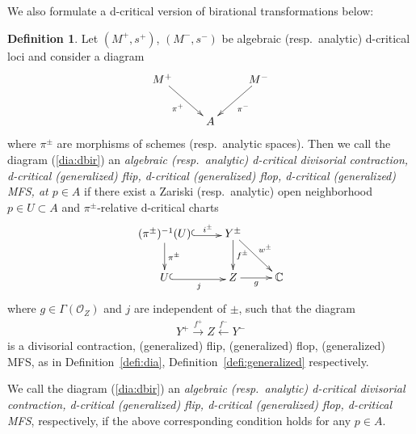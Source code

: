\documentclass[11pt]{amsart}
\theoremstyle{plain}
\theoremstyle{definition}
\newtheorem{defi}[thm]{Definition}
\theoremstyle{remark}
\newcommand{\oO}{\mathcal{O}}
\begin{document}
We also formulate a d-critical version of 
birational transformations below: 

\begin{defi}\label{defi:dflip}
Let $(M^{+}, s^{+})$, $(M^{-}, s^{-})$ be 
algebraic (resp.~analytic) d-critical loci and consider 
a diagram 
\begin{align}\label{dia:dbir}
\xymatrix{
M^{+} \ar[rd]_-{\pi^{+}} &  &  M^{-} \ar[ld]^-{\pi^{-}} \\
& A &
}
\end{align}
where $\pi^{\pm}$ are morphisms of schemes (resp.~analytic spaces). 
Then we call the diagram (\ref{dia:dbir}) 
an \textit{algebraic (resp.~analytic) 
d-critical divisorial contraction, 
d-critical (generalized) flip, 
d-critical (generalized) flop, d-critical (generalized) MFS,
at $p \in A$} if there exist a Zariski (resp.~analytic) open neighborhood $p\in U \subset A$
and 
$\pi^{\pm}$-relative d-critical charts 
\begin{align}\label{relchart2}
\xymatrix{
(\pi^{\pm})^{-1}(U) \ar[d]^-{\pi^{\pm}}
 \ar@<-0.3ex>@{^{(}->}[r]^-{i^{\pm}} 
& Y^{\pm} \ar[d]^-{f^{\pm}} \ar[rd]^-{w^{\pm}} \\
U \ar@<-0.3ex>@{^{(}->}[r]_-{j} & Z \ar[r]_-{g} & \mathbb{C}
}
\end{align}
where 
$g \in \Gamma(\oO_Z)$ 
and $j$ are
independent of $\pm$, 
such that the diagram 
\begin{align}\label{dia:YZ}
Y^{+} \stackrel{f^{+}}{\to} Z \stackrel{f^{-}}{\leftarrow} Y^{-}
\end{align}
 is 
a divisorial contraction, (generalized) flip, (generalized) flop,
(generalized) MFS, as in Definition~\ref{defi:dia}, 
Definition~\ref{defi:generalized}
respectively. 

We call the diagram (\ref{dia:dbir}) 
an \textit{algebraic (resp.~analytic)
d-critical divisorial contraction, d-critical (generalized) flip, 
d-critical (generalized) flop, d-critical MFS}, 
respectively, if the above corresponding condition holds for any 
$p \in A$. 
\end{defi}
\end{document}
